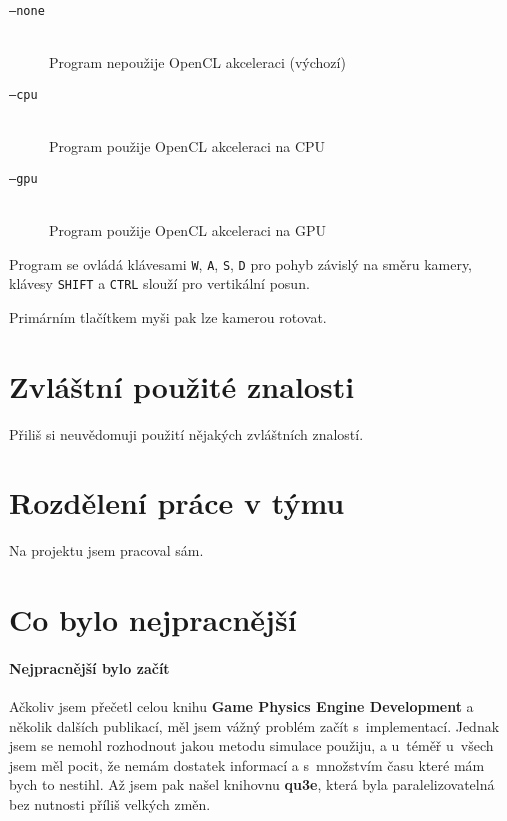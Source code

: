 \documentclass[11pt,a4paper]{article}
\begin{document}
\begin{description}
  \item[\texttt{--none}] ~ \\
    Program nepoužije OpenCL akceleraci (výchozí)
  \item[\texttt{--cpu}] ~ \\
    Program použije OpenCL akceleraci na CPU
  \item[\texttt{--gpu}] ~ \\
    Program použije OpenCL akceleraci na GPU
\end{description}

Program se ovládá klávesami \texttt{W}, \texttt{A}, \texttt{S}, \texttt{D}
pro pohyb závislý na směru kamery, klávesy \texttt{SHIFT} a \texttt{CTRL}
slouží pro vertikální posun.

Primárním tlačítkem myši pak lze kamerou rotovat.

\section{Zvláštní použité znalosti}

Přiliš si neuvědomuji použití nějakých zvláštních znalostí.

\section{Rozdělení práce v týmu}

Na projektu jsem pracoval sám.

\section{Co bylo nejpracnější}

\paragraph{Nejpracnější bylo začít}

Ačkoliv jsem přečetl celou knihu \textbf{Game Physics Engine Development} a
několik dalších publikací, měl jsem vážný problém začít s~implementací.
Jednak jsem se nemohl rozhodnout jakou metodu simulace použiju,
a u~téměř u~všech jsem měl pocit, že nemám dostatek informací a s~množstvím
času které mám bych to nestihl. Až jsem pak našel knihovnu \textbf{qu3e}, která
byla paralelizovatelná bez nutnosti příliš velkých změn.
\end{document}
